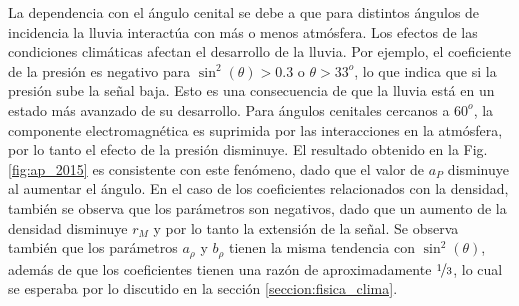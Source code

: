         La dependencia con el ángulo cenital se debe a que para distintos ángulos de incidencia la lluvia interactúa con más o menos atmósfera. Los efectos de las condiciones climáticas afectan el desarrollo de la lluvia. Por ejemplo, el coeficiente de la presión  es negativo para $\sin^2(\theta)>0.3$ o $\theta>33^o$, lo que indica que si la presión sube la señal baja. Esto es una consecuencia de que la lluvia  está en un estado más avanzado de su desarrollo. Para ángulos cenitales cercanos a $60^o$, la componente electromagnética es suprimida por las interacciones en la atmósfera, por lo tanto el efecto de la presión disminuye. El resultado obtenido en la Fig.\,\ref{fig:ap_2015} es consistente con este fenómeno, dado que el valor de $a_P$ disminuye al aumentar el ángulo. 		En el caso de los coeficientes relacionados con la densidad, también se observa que los parámetros son negativos, dado que un aumento de la densidad disminuye $r_M$ y por lo tanto la extensión de la señal. Se observa también que los parámetros $a_\rho$ y $b_\rho$ tienen la misma tendencia con $\sin^2(\theta)$, además de que los coeficientes tienen una razón de aproximadamente $\nicefrac{1}{3}$, lo cual se esperaba por lo discutido en la sección \ref{seccion:fisica_clima}.
